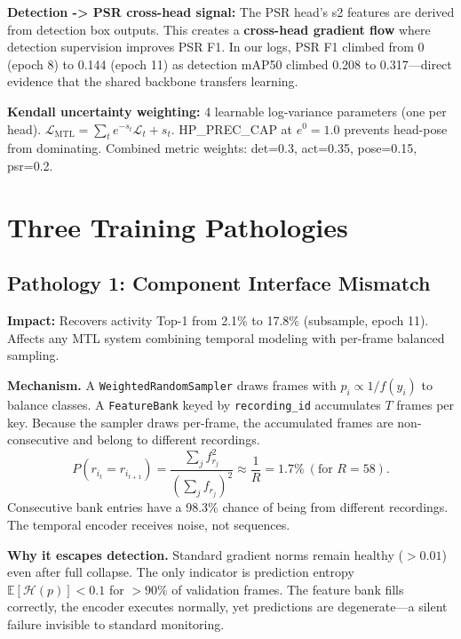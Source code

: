 \documentclass[conference]{IEEEtran}
\begin{document}
\textbf{Detection -> PSR cross-head signal:} The PSR head's s2 features are derived from detection box outputs. This creates a \textbf{cross-head gradient flow} where detection supervision improves PSR F1. In our logs, PSR F1 climbed from 0 (epoch 8) to 0.144 (epoch 11) as detection mAP50 climbed 0.208 to 0.317---direct evidence that the shared backbone transfers learning.

\textbf{Kendall uncertainty weighting:} 4 learnable log-variance parameters (one per head). $\mathcal{L}_{\text{MTL}} = \sum_t e^{-s_t}\mathcal{L}_t + s_t$. HP\_PREC\_CAP at $e^{0}=1.0$ prevents head-pose from dominating. Combined metric weights: det=0.3, act=0.35, pose=0.15, psr=0.2.

\section{Three Training Pathologies}
\label{sec:pathology}

\subsection{Pathology 1: Component Interface Mismatch}
\label{sec:path1}

\textbf{Impact:} Recovers activity Top-1 from 2.1\% to 17.8\% (subsample, epoch 11). Affects any MTL system combining temporal modeling with per-frame balanced sampling.

\textbf{Mechanism.} A \texttt{WeightedRandomSampler} draws frames with $p_i \propto 1/f(y_i)$ to balance classes. A \texttt{FeatureBank} keyed by \texttt{recording\_id} accumulates $T$ frames per key. Because the sampler draws per-frame, the accumulated frames are non-consecutive and belong to different recordings.
\begin{equation}
P(r_{i_t} = r_{i_{t+1}}) = \frac{\sum_j f_{r_j}^2}{(\sum_j f_{r_j})^2} \approx \frac{1}{R} = 1.7\%\ (\text{for }R=58).
\label{eq:collapse_prob}
\end{equation}
Consecutive bank entries have a 98.3\% chance of being from different recordings. The temporal encoder receives noise, not sequences.

\textbf{Why it escapes detection.} Standard gradient norms remain healthy ($>0.01$) even after full collapse. The only indicator is prediction entropy $\mathbb{E}[\mathcal{H}(p)] < 0.1$ for $>90\%$ of validation frames. The feature bank fills correctly, the encoder executes normally, yet predictions are degenerate---a silent failure invisible to standard monitoring.
\end{document}
